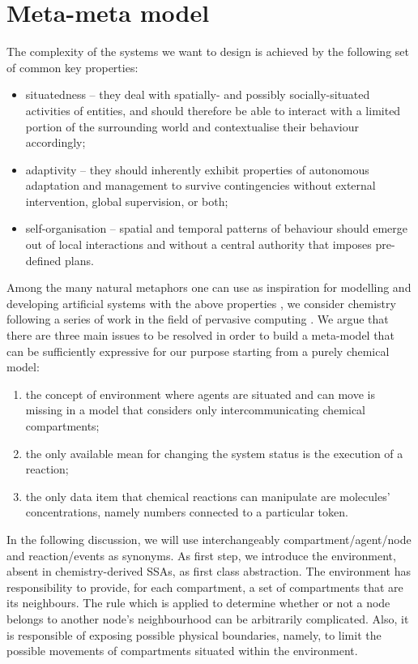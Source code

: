 \documentclass[12pt,a4paper,twoside,openright]{book}
\begin{document}
\chapter{Meta-meta model}
\label{meta-meta-model}
The complexity of the systems we want to design is achieved by the following set of common key properties:
\begin{itemize}
 \item situatedness -- they deal with spatially- and possibly socially-situated activities of entities, and should therefore be able to interact with a limited portion of the surrounding world and contextualise their behaviour accordingly; 
 \item adaptivity -- they should inherently exhibit properties of autonomous adaptation and management to survive contingencies without external intervention, global supervision, or both; 
 \item self-organisation -- spatial and temporal patterns of behaviour should emerge out of local interactions and without a central authority that imposes pre-defined plans.
\end{itemize}

Among the many natural metaphors one can use as inspiration for modelling and developing artificial systems with the above properties \cite{ecosystems-jpcc7}, we consider chemistry following a series of work in the field of pervasive computing \cite{VCMZ-TAAS2011,VZ-INS2010,sapere-procedia7}. 
%
We argue that there are three main issues to be resolved in order to build a meta-model that can be sufficiently expressive for our purpose starting from a purely chemical model:
\begin{enumerate}
 \item the concept of environment where agents are situated and can move is missing in a model that considers only intercommunicating chemical compartments;
 \item the only available mean for changing the system status is the execution of a reaction;
 \item the only data item that chemical reactions can manipulate are molecules' concentrations, namely numbers connected to a particular token.
\end{enumerate}

In the following discussion, we will use interchangeably compartment/agent/node and reaction/events as synonyms.
%
As first step, we introduce the environment, absent in chemistry-derived SSAs, as first class abstraction.
%
The environment has responsibility to provide, for each compartment, a set of compartments that are its neighbours.
%
The rule which is applied to determine whether or not a node belongs to another node's neighbourhood  can be arbitrarily complicated.
%
Also, it is responsible of exposing possible physical boundaries, namely, to limit the possible movements of compartments situated within the environment.
\end{document}
